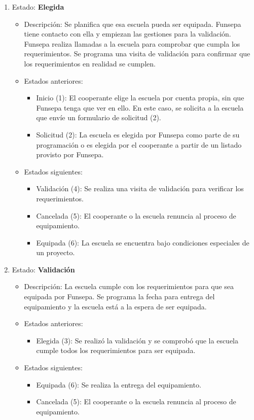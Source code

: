 \documentclass[11pt]{report}
\begin{document}
\begin{enumerate}
\begin{itemize}
		\end{itemize}
		\item Estado: \textbf{Elegida}
		\begin{itemize}
			\item Descripción: Se planifica que esa escuela pueda ser equipada. Funsepa tiene contacto con ella y empiezan las gestiones para la validación. Funsepa realiza llamadas a la escuela para comprobar que cumpla los requerimientos. Se programa una visita de validación para confirmar que los requerimientos en realidad se cumplen.
			\item Estados anteriores:
			\begin{itemize}
				\item Inicio (1): El cooperante elige la escuela por cuenta propia, sin que Funsepa tenga que ver en ello. En este caso, se solicita a la escuela que envíe un formulario de solicitud (2).
				\item Solicitud (2): La escuela es elegida por Funsepa como parte de su programación o es elegida por el cooperante a partir de un listado provisto por Funsepa.
			\end{itemize}
			\item Estados siguientes:
			\begin{itemize}
				\item Validación (4): Se realiza una visita de validación para verificar los requerimientos.
				\item Cancelada (5): El cooperante o la escuela renuncia al proceso de equipamiento.
				\item Equipada (6): La escuela se encuentra bajo condiciones especiales de un proyecto.
			\end{itemize}
		\end{itemize}
		
		\item Estado: \textbf{Validación}
		\begin{itemize}
			\item Descripción: La escuela cumple con los requerimientos para que sea equipada por Funsepa. Se programa la fecha para entrega del equipamiento y la escuela está a la espera de ser equipada.
			\item Estados anteriores:
			\begin{itemize}
				\item Elegida (3): Se realizó la validación y se comprobó que la escuela cumple todos los requerimientos para ser equipada.
			\end{itemize}
			\item Estados siguientes:
			\begin{itemize}
				\item Equipada (6): Se realiza la entrega del equipamiento.
				\item Cancelada (5): El cooperante o la escuela renuncia al proceso de equipamiento.
			\end{itemize}
		\end{itemize}
		

\end{enumerate}
\end{document}
